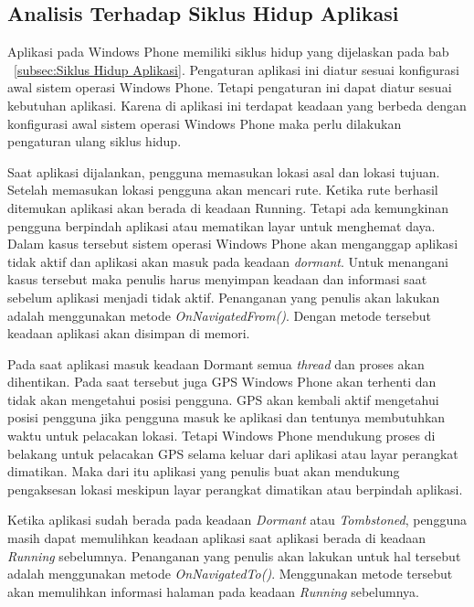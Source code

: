 \subsection{Analisis Terhadap Siklus Hidup Aplikasi}
\label{lab:Analisis Terhadap Siklus Hidup Aplikasi}
\hspace{0.5cm} Aplikasi pada Windows Phone memiliki siklus hidup yang dijelaskan pada bab ~\ref{subsec:Siklus Hidup Aplikasi}. Pengaturan aplikasi ini diatur sesuai konfigurasi awal sistem operasi Windows Phone. Tetapi pengaturan ini dapat diatur sesuai kebutuhan aplikasi. Karena di aplikasi ini terdapat keadaan yang berbeda dengan konfigurasi awal sistem operasi Windows Phone maka perlu dilakukan pengaturan ulang siklus hidup.

Saat aplikasi dijalankan, pengguna memasukan lokasi asal dan lokasi tujuan. Setelah memasukan lokasi pengguna akan mencari rute. Ketika rute berhasil ditemukan aplikasi akan berada di keadaan Running. Tetapi ada kemungkinan pengguna berpindah aplikasi atau mematikan layar untuk menghemat daya. Dalam kasus tersebut sistem operasi Windows Phone akan menganggap aplikasi tidak aktif dan aplikasi akan masuk pada keadaan \textit{dormant}. Untuk menangani kasus tersebut maka penulis harus menyimpan keadaan dan informasi saat sebelum aplikasi menjadi tidak aktif. Penanganan yang penulis akan lakukan adalah menggunakan metode \textit{OnNavigatedFrom()}. Dengan metode tersebut keadaan aplikasi akan disimpan di memori.

Pada saat aplikasi masuk keadaan Dormant semua \textit{thread} dan proses akan dihentikan. Pada saat tersebut juga GPS Windows Phone akan terhenti dan tidak akan mengetahui posisi pengguna. GPS akan kembali aktif mengetahui posisi pengguna jika pengguna masuk ke aplikasi dan tentunya membutuhkan waktu untuk pelacakan lokasi. Tetapi Windows Phone mendukung proses di belakang untuk pelacakan GPS selama keluar dari aplikasi atau layar perangkat dimatikan. Maka dari itu aplikasi yang penulis buat akan mendukung pengaksesan lokasi meskipun layar perangkat dimatikan atau berpindah aplikasi. 

Ketika aplikasi sudah berada pada keadaan \textit{Dormant} atau \textit{Tombstoned}, pengguna masih dapat memulihkan keadaan aplikasi saat aplikasi berada di keadaan \textit{Running} sebelumnya. Penanganan yang penulis akan lakukan untuk hal tersebut adalah menggunakan metode \textit{OnNavigatedTo()}. Menggunakan metode tersebut akan memulihkan informasi halaman pada keadaan \textit{Running} sebelumnya.

